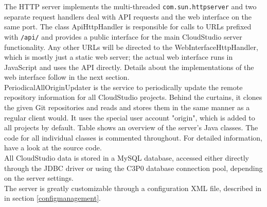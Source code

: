 The HTTP server implements the multi-threaded \texttt{com.sun.httpserver} and two separate request handlers deal with API requests and the web interface on the same port. The class ApiHttpHandler is responsible for calls to URLs prefixed with \texttt{/api/} and provides a public interface for the main CloudStudio server functionality. Any other URLs will be directed to the WebInterfaceHttpHandler, which is mostly just a static web server; the actual web interface runs in JavaScript and uses the API directly. Details about the implementations of the web interface follow in the next section. \\

PeriodicalAllOriginUpdater is the service to periodically update the remote repository information for all CloudStudio projects. Behind the curtains, it clones the given Git repositories and reads and stores them in the same manner as a regular client would. It uses the special user account "origin", which is added to all projects by default. Table \cite{table:serverclasses} shows an overview of the server's Java classes. The code for all individual classes is commented throughout. For detailed information, have a look at the source code. \\

All CloudStudio data is stored in a MySQL database, accessed either directly through the JDBC driver or using the C3P0 database connection pool, depending on the server settings. \\

The server is greatly customizable through a configuration XML file, described in in section \ref{configmanagement}.


